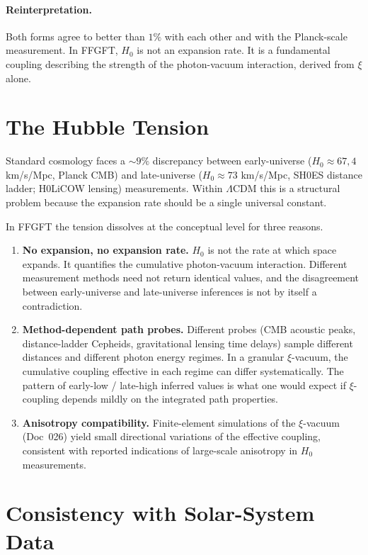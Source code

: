 \documentclass[11pt,a4paper]{article}
\begin{document}
\paragraph{Reinterpretation.} Both forms agree to better than $1\%$ with each other and with the Planck-scale measurement. In FFGFT, $H_0$ is not an expansion rate. It is a fundamental coupling describing the strength of the photon-vacuum interaction, derived from $\xi$ alone.

\section{The Hubble Tension}

Standard cosmology faces a $\sim 9\%$ discrepancy between early-universe ($H_0 \approx 67{,}4$ km/s/Mpc, Planck CMB) and late-universe ($H_0 \approx 73$ km/s/Mpc, SH0ES distance ladder; H0LiCOW lensing) measurements. Within $\Lambda$CDM this is a structural problem because the expansion rate should be a single universal constant.

In FFGFT the tension dissolves at the conceptual level for three reasons.

\begin{enumerate}\itemsep2pt
\item \textbf{No expansion, no expansion rate.} $H_0$ is not the rate at which space expands. It quantifies the cumulative photon-vacuum interaction. Different measurement methods need not return identical values, and the disagreement between early-universe and late-universe inferences is not by itself a contradiction.

\item \textbf{Method-dependent path probes.} Different probes (CMB acoustic peaks, distance-ladder Cepheids, gravitational lensing time delays) sample different distances and different photon energy regimes. In a granular $\xi$-vacuum, the cumulative coupling effective in each regime can differ systematically. The pattern of early-low / late-high inferred values is what one would expect if $\xi$-coupling depends mildly on the integrated path properties.

\item \textbf{Anisotropy compatibility.} Finite-element simulations of the $\xi$-vacuum (Doc~026) yield small directional variations of the effective coupling, consistent with reported indications of large-scale anisotropy in $H_0$ measurements.
\end{enumerate}

\section{Consistency with Solar-System Data}
\end{document}
